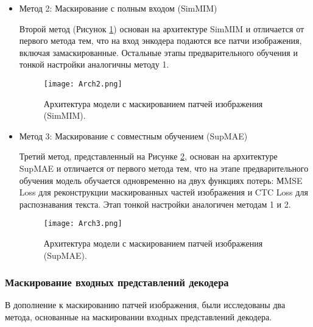 \begin{itemize}
   \item Метод 2: Маскирование с полным входом (SimMIM)

   Второй метод (Рисунок \ref{4}) основан на архитектуре SimMIM \cite{xie2021simmim} и отличается от первого метода тем, что на вход энкодера подаются все патчи изображения, включая замаскированные. Остальные этапы предварительного обучения и тонкой настройки аналогичны методу 1.

   \begin{figure}[H]
     \centering
     \texttt{[image: Arch2.png]}
     \caption{Архитектура модели с маскированием патчей изображения (SimMIM).}
     \label{4} 
   \end{figure}

   \item Метод 3: Маскирование с совместным обучением (SupMAE)
   
   Третий метод, представленный на Рисунке \ref{5}, основан на архитектуре SupMAE \cite{gao2022supmae} и отличается от первого метода тем, что на этапе предварительного обучения модель обучается одновременно на двух функциях потерь: МMSE Loss для реконструкции маскированных частей изображения и CTC Loss для распознавания текста. Этап тонкой настройки аналогичен методам 1 и 2.

   \begin{figure}[H]
     \centering
     \texttt{[image: Arch3.png]}
     \caption{Архитектура модели с маскированием патчей изображения (SupMAE).}
     \label{5} 
   \end{figure}
\end{itemize}
   
\subsubsection{Маскирование входных представлений декодера}

В дополнение к маскированию патчей изображения, были исследованы два метода, основанные на маскировании входных представлений декодера.

